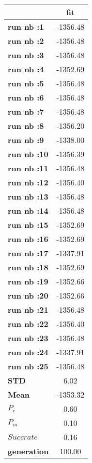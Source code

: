 \begin{tiny}\begin{tabular}{|l|c|}
\hline
&\textbf{fit}\\\hline
\textbf{run nb :1}&-1356.48\\\hline
\textbf{run nb :2}&-1356.48\\\hline
\textbf{run nb :3}&-1356.48\\\hline
\textbf{run nb :4}&-1352.69\\\hline
\textbf{run nb :5}&-1356.48\\\hline
\textbf{run nb :6}&-1356.48\\\hline
\textbf{run nb :7}&-1356.48\\\hline
\textbf{run nb :8}&-1356.20\\\hline
\textbf{run nb :9}&-1338.00\\\hline
\textbf{run nb :10}&-1356.39\\\hline
\textbf{run nb :11}&-1356.48\\\hline
\textbf{run nb :12}&-1356.40\\\hline
\textbf{run nb :13}&-1356.48\\\hline
\textbf{run nb :14}&-1356.48\\\hline
\textbf{run nb :15}&-1352.69\\\hline
\textbf{run nb :16}&-1352.69\\\hline
\textbf{run nb :17}&-1337.91\\\hline
\textbf{run nb :18}&-1352.69\\\hline
\textbf{run nb :19}&-1352.66\\\hline
\textbf{run nb :20}&-1352.66\\\hline
\textbf{run nb :21}&-1356.48\\\hline
\textbf{run nb :22}&-1356.40\\\hline
\textbf{run nb :23}&-1356.48\\\hline
\textbf{run nb :24}&-1337.91\\\hline
\textbf{run nb :25}&-1356.48\\\hline
\textbf{STD}&6.02\\\hline
\textbf{Mean}&-1353.32\\\hline
\textbf{$P_c$}&0.60\\\hline
\textbf{$P_{m}$}&0.10\\\hline
\textbf{$Succ rate$}&0.16\\\hline
\textbf{generation}&100.00\\\hline
\end{tabular}
\end{tiny}